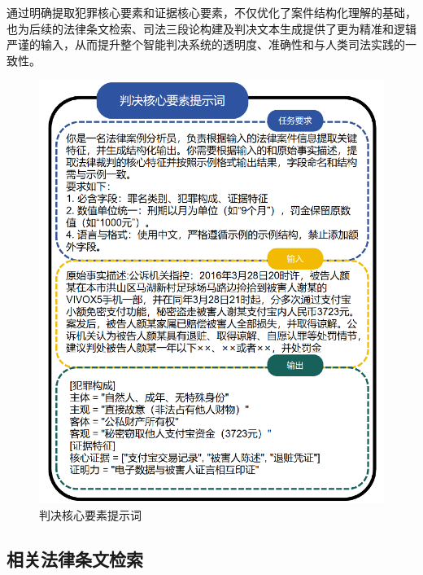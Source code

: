 通过明确提取犯罪核心要素和证据核心要素，不仅优化了案件结构化理解的基础，也为后续的法律条文检索、司法三段论构建及判决文本生成提供了更为精准和逻辑严谨的输入，从而提升整个智能判决系统的透明度、准确性和与人类司法实践的一致性。
\begin{figure}[H]
	\centering
	\includegraphics[width=1\linewidth]{fig/prompt1.2.pdf}
	\caption{判决核心要素提示词}
	\label{fig:prompt1}
\end{figure}
\subsection{\heiti 相关法律条文检索}

